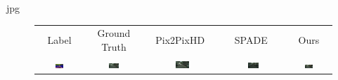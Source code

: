 jpg\addtolength{\tabcolsep}{-4.5pt}    
\bgroup
\def\arraystretch{0.5}%
\begin{figure}[]
\begin{tabular} {cc|cc|c}
 Label & Ground Truth & Pix2PixHD~\cite{wang2018pix2pixHD} &  SPADE~\cite{park2019SPADE} & Ours\\
\includegraphics[width=0.1932\textwidth]{Images/Rec/CityScape/label/munster_000017_000019_leftImg8bit.png} & \includegraphics[width=0.1932\textwidth]{Images/Rec/CityScape/gt/munster_000017_000019_leftImg8bit.jpg} &
\includegraphics[width=0.1932\textwidth]{Images/Rec/CityScape/pix2pixhd/munster_000017_000019_leftImg8bit.jpg} &   \includegraphics[width=0.1932\textwidth]{Images/Rec/CityScape/spade/munster_000017_000019_leftImg8bit.jpg} &  \includegraphics[width=0.1932\textwidth]{Images/Rec/CityScape/ours/munster_000017_000019_leftImg8bit.png} \\
 


\end{tabular}
\end{figure}
